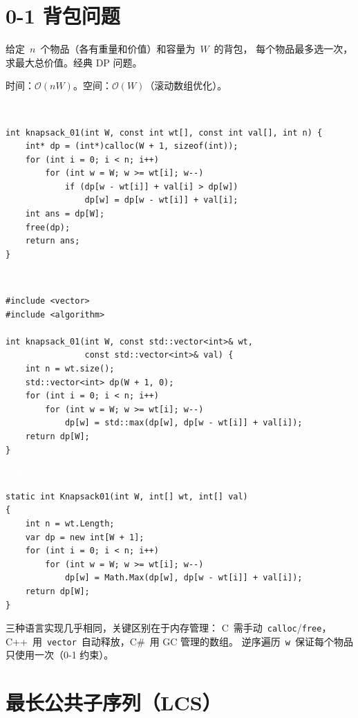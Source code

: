 \documentclass[12pt,a4paper,fontset=fandol]{ctexbook}
\newcommand{\clabel}{%
  \noindent\begin{tcolorbox}[sharp corners,colback=cheadbg,colframe=cheadbg,
    left=6pt,right=6pt,top=2pt,bottom=2pt,boxrule=0pt]
  \textcolor{white}{\small\bfseries\sffamily C}\end{tcolorbox}%
}
\newcommand{\cpplabel}{%
  \noindent\begin{tcolorbox}[sharp corners,colback=cppheadbg,colframe=cppheadbg,
    left=6pt,right=6pt,top=2pt,bottom=2pt,boxrule=0pt]
  \textcolor{white}{\small\bfseries\sffamily C++}\end{tcolorbox}%
}
\newcommand{\csharplabel}{%
  \noindent\begin{tcolorbox}[sharp corners,colback=csharpheadbg,colframe=csharpheadbg,
    left=6pt,right=6pt,top=2pt,bottom=2pt,boxrule=0pt]
  \textcolor{white}{\small\bfseries\sffamily C\#}\end{tcolorbox}%
}
\newcommand{\bigO}[1]{\mathcal{O}(#1)}
\newcommand{\Tp}[1]{\texttt{#1}}
\begin{document}
\chapter{0-1 背包问题}

给定~$n$~个物品（各有重量和价值）和容量为~$W$~的背包，
每个物品最多选一次，求最大总价值。经典 DP 问题。

\begin{complexitybox}
  时间：$\bigO{nW}$。空间：$\bigO{W}$（滚动数组优化）。
\end{complexitybox}

\clabel
\begin{lstlisting}[style=cstyle]
int knapsack_01(int W, const int wt[], const int val[], int n) {
    int* dp = (int*)calloc(W + 1, sizeof(int));
    for (int i = 0; i < n; i++)
        for (int w = W; w >= wt[i]; w--)
            if (dp[w - wt[i]] + val[i] > dp[w])
                dp[w] = dp[w - wt[i]] + val[i];
    int ans = dp[W];
    free(dp);
    return ans;
}
\end{lstlisting}

\cpplabel
\begin{lstlisting}[style=cppstyle]
#include <vector>
#include <algorithm>

int knapsack_01(int W, const std::vector<int>& wt,
                const std::vector<int>& val) {
    int n = wt.size();
    std::vector<int> dp(W + 1, 0);
    for (int i = 0; i < n; i++)
        for (int w = W; w >= wt[i]; w--)
            dp[w] = std::max(dp[w], dp[w - wt[i]] + val[i]);
    return dp[W];
}
\end{lstlisting}

\csharplabel
\begin{lstlisting}[style=csharpstyle]
static int Knapsack01(int W, int[] wt, int[] val)
{
    int n = wt.Length;
    var dp = new int[W + 1];
    for (int i = 0; i < n; i++)
        for (int w = W; w >= wt[i]; w--)
            dp[w] = Math.Max(dp[w], dp[w - wt[i]] + val[i]);
    return dp[W];
}
\end{lstlisting}

\begin{compare}
三种语言实现几乎相同，关键区别在于内存管理：
C~需手动~\texttt{calloc}/\allowbreak{}\texttt{free}，C++~用~\Tp{vector}~自动释放，C\#~用 GC 管理的数组。
逆序遍历~\texttt{w}~保证每个物品只使用一次（0-1 约束）。
\end{compare}

\chapter{最长公共子序列（LCS）}
\end{document}
